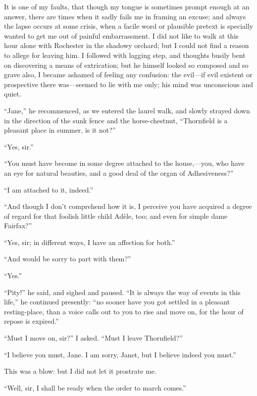It is one of my faults, that though my tongue is sometimes prompt enough
at an answer, there are times when it sadly fails me in framing an
excuse; and always the lapse occurs at some crisis, when a facile word
or plausible pretext is specially wanted to get me out of painful
embarrassment. I did not like to walk at this hour alone with \Mr{}
 Rochester in the shadowy orchard; but I could not find a reason to
allege for leaving him. I followed with lagging step, and thoughts
busily bent on discovering a means of extrication; but he himself looked
so composed and so grave also, I became ashamed of feeling any
confusion: the evil---if evil existent or prospective there was---seemed
to lie with me only; his mind was unconscious and quiet.

\enquote{Jane,} he recommenced, as we entered the laurel walk, and
slowly strayed down in the direction of the sunk fence and the
horse-chestnut, \enquote{Thornfield is a pleasant place in summer, is it
not?}

\enquote{Yes, sir.}

\enquote{You must have become in some degree attached to the
house,---you, who have an eye for natural beauties, and a good deal of
the organ of Adhesiveness?}

\enquote{I am attached to it, indeed.}

\enquote{And though I don't comprehend how it is, I perceive you have
acquired a degree of regard for that foolish little child Adèle, too;
and even for simple dame Fairfax?}

\enquote{Yes, sir; in different ways, I have an affection for both.}

\enquote{And would be sorry to part with them?}

\enquote{Yes.}

\enquote{Pity!} he said, and sighed and paused. \enquote{It is always
the way of events in this life,} he continued presently: \enquote{no
sooner have you got settled in a pleasant resting-place, than a voice
calls out to you to rise and move on, for the hour of repose is
expired.}

\enquote{Must I move on, sir?} I asked. \enquote{Must I leave
Thornfield?}

\enquote{I believe you must, Jane. I am sorry, Janet, but I believe
indeed you must.}

This was a blow: but I did not let it prostrate me.

\enquote{Well, sir, I shall be ready when the order to march comes.}

